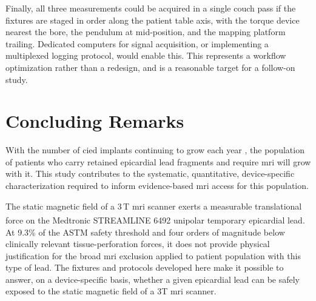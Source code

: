 Finally, all three measurements could be acquired in a single couch pass if the fixtures are staged in order along the patient table axis, with the torque device nearest the bore, the pendulum at mid-position, and the mapping platform trailing. Dedicated computers for signal acquisition, or implementing a multiplexed logging protocol, would enable this. This represents a workflow optimization rather than a redesign, and is a reasonable target for a follow-on study.

\section{Concluding Remarks}

With the number of \gls{cied} implants continuing to grow each year \cite{HRS2024_CIEDs}, the population of patients who carry retained epicardial lead fragments and require \gls{mri} will grow with it. This study contributes to the systematic, quantitative, device-specific characterization required to inform evidence-based \gls{mri} access for this population.

The static magnetic field of a 3\,T \gls{mri} scanner exerts a measurable translational force on the Medtronic STREAMLINE\textsuperscript{\texttrademark{}} 6492 unipolar temporary epicardial lead. At 9.3\% of the ASTM safety threshold and four orders of magnitude below clinically relevant tissue-perforation forces, it does not provide physical justification for the broad \gls{mri} exclusion applied to patient population with this type of lead. The fixtures and protocols developed here make it possible to answer, on a device-specific basis, whether a given epicardial lead can be safely exposed to the static magnetic field of a 3T \gls{mri} scanner.


